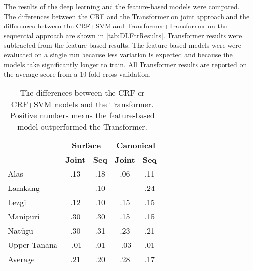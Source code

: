 The results of the deep learning and the feature-based models were compared. The differences between the CRF and the Transformer on joint approach and the differences between the CRF+SVM and Transformer+Transformer on the sequential approach are shown in \autoref{tab:DLFtrResults}. Transformer results were subtracted from the feature-based results. The feature-based models were were evaluated on a single run because less variation is expected and because the models take significantly longer to train. All Transformer results are reported on the average score from a 10-fold cross-validation. 

\begin{table}[!tb]
    \centering
    \begin{tabular}{l|cc|cc}
        & \multicolumn{2}{c|}{\textbf{Surface}} & \multicolumn{2}{c}{\textbf{Canonical}} \\
        & \textbf{Joint} & \textbf{Seq} & \textbf{Joint} & \textbf{Seq} \\
        \hline
        Alas & .13 & .18 & .06 & .11 \\
        \hline
        Lamkang &  & .10 &  & .24 \\
        \hline
        Lezgi & .12 & .10 & .15 & .15 \\
        \hline
        Manipuri & .30 & .30 & .15 & .15 \\
        \hline
        Nat\"ugu & .30 & .31 & .23 & .21 \\
        \hline
        Upper Tanana & -.01 & .01 & -.03 & .01 \\
        \hline
        \hline
        Average & .21 & .20 & .28 & .17 \\
    \end{tabular}
    \caption[F$_1$-score Differences of Feature-based Models minus Deep Learning]{The differences between the CRF or CRF+SVM models and the Transformer. Positive numbers means the feature-based model outperformed the Transformer.}
    \label{tab:DLFtrResults}
\end{table}


